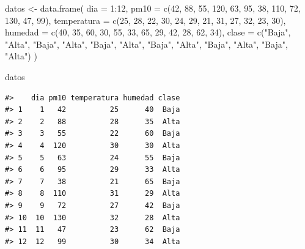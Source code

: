 \documentclass[
  spanish,
  10.5pt,
  letterpaper,
  openany,
  headings=big]{scrbook}
\newenvironment{Shaded}{}{}
\newcommand{\AttributeTok}[1]{\textcolor[rgb]{0.84,0.23,0.29}{#1}}
\newcommand{\DecValTok}[1]{\textcolor[rgb]{0.00,0.36,0.77}{#1}}
\newcommand{\FunctionTok}[1]{\textcolor[rgb]{0.44,0.26,0.76}{#1}}
\newcommand{\NormalTok}[1]{\textcolor[rgb]{0.14,0.16,0.18}{#1}}
\newcommand{\OtherTok}[1]{\textcolor[rgb]{0.44,0.26,0.76}{#1}}
\newcommand{\SpecialCharTok}[1]{\textcolor[rgb]{0.00,0.36,0.77}{#1}}
\newcommand{\StringTok}[1]{\textcolor[rgb]{0.01,0.18,0.38}{#1}}
\begin{document}
\begin{Shaded}
\begin{Highlighting}[]
\NormalTok{datos }\OtherTok{\textless{}{-}} \FunctionTok{data.frame}\NormalTok{(}
  \AttributeTok{dia =} \DecValTok{1}\SpecialCharTok{:}\DecValTok{12}\NormalTok{,}
  \AttributeTok{pm10 =} \FunctionTok{c}\NormalTok{(}\DecValTok{42}\NormalTok{, }\DecValTok{88}\NormalTok{, }\DecValTok{55}\NormalTok{, }\DecValTok{120}\NormalTok{, }\DecValTok{63}\NormalTok{, }\DecValTok{95}\NormalTok{, }\DecValTok{38}\NormalTok{, }\DecValTok{110}\NormalTok{, }\DecValTok{72}\NormalTok{, }\DecValTok{130}\NormalTok{, }\DecValTok{47}\NormalTok{, }\DecValTok{99}\NormalTok{),}
  \AttributeTok{temperatura =} \FunctionTok{c}\NormalTok{(}\DecValTok{25}\NormalTok{, }\DecValTok{28}\NormalTok{, }\DecValTok{22}\NormalTok{, }\DecValTok{30}\NormalTok{, }\DecValTok{24}\NormalTok{, }\DecValTok{29}\NormalTok{, }\DecValTok{21}\NormalTok{, }\DecValTok{31}\NormalTok{, }\DecValTok{27}\NormalTok{, }\DecValTok{32}\NormalTok{, }\DecValTok{23}\NormalTok{, }\DecValTok{30}\NormalTok{),}
  \AttributeTok{humedad =} \FunctionTok{c}\NormalTok{(}\DecValTok{40}\NormalTok{, }\DecValTok{35}\NormalTok{, }\DecValTok{60}\NormalTok{, }\DecValTok{30}\NormalTok{, }\DecValTok{55}\NormalTok{, }\DecValTok{33}\NormalTok{, }\DecValTok{65}\NormalTok{, }\DecValTok{29}\NormalTok{, }\DecValTok{42}\NormalTok{, }\DecValTok{28}\NormalTok{, }\DecValTok{62}\NormalTok{, }\DecValTok{34}\NormalTok{),}
  \AttributeTok{clase =} \FunctionTok{c}\NormalTok{(}\StringTok{"Baja"}\NormalTok{, }\StringTok{"Alta"}\NormalTok{, }\StringTok{"Baja"}\NormalTok{, }\StringTok{"Alta"}\NormalTok{, }\StringTok{"Baja"}\NormalTok{, }\StringTok{"Alta"}\NormalTok{, }\StringTok{"Baja"}\NormalTok{, }\StringTok{"Alta"}\NormalTok{, }\StringTok{"Baja"}\NormalTok{, }\StringTok{"Alta"}\NormalTok{, }\StringTok{"Baja"}\NormalTok{, }\StringTok{"Alta"}\NormalTok{)}
\NormalTok{)}

\NormalTok{datos}
\end{Highlighting}
\end{Shaded}

\begin{verbatim}
#>    dia pm10 temperatura humedad clase
#> 1    1   42          25      40  Baja
#> 2    2   88          28      35  Alta
#> 3    3   55          22      60  Baja
#> 4    4  120          30      30  Alta
#> 5    5   63          24      55  Baja
#> 6    6   95          29      33  Alta
#> 7    7   38          21      65  Baja
#> 8    8  110          31      29  Alta
#> 9    9   72          27      42  Baja
#> 10  10  130          32      28  Alta
#> 11  11   47          23      62  Baja
#> 12  12   99          30      34  Alta
\end{verbatim}
\end{document}
